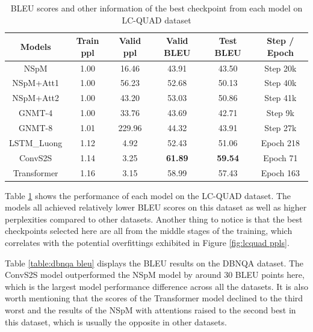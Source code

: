\begin{table}[h]
\centering
\caption{BLEU scores and other information of the best checkpoint from each model on LC-QUAD dataset}
\label{table:lc-quad bleu}
\begin{tabular}{c|c|c|c|c|c}
Models & Train ppl & Valid ppl & \textbf{Valid BLEU} & \textbf{Test BLEU} & Step / Epoch \\
\hline
NSpM & 1.00 & 16.46 & 43.91 & 43.50 & Step 20k \\
NSpM+Att1 & 1.00 & 56.23 & 52.68 & 50.13 & Step 40k \\
NSpM+Att2 & 1.00 & 43.20 & 53.03 & 50.86 & Step 41k \\
GNMT-4 & 1.00 & 33.76 & 43.69 & 42.71 & Step 9k \\
GNMT-8 & 1.01 & 229.96 & 44.32 & 43.91 & Step 27k \\
LSTM\_Luong & 1.12 & 4.92 & 52.43 & 51.06 & Epoch 218 \\
ConvS2S & 1.14 & 3.25 & \textbf{61.89} & \textbf{59.54} & Epoch 71 \\
Transformer & 1.16 & 3.15 & 58.99 & 57.43 & Epoch 163 \\
\end{tabular}
\end{table}

Table \ref{table:lc-quad bleu} shows the performance of each model on the LC-QUAD dataset. The models all achieved relatively lower BLEU scores on this dataset as well as higher perplexities compared to other datasets. Another thing to notice is that the best checkpoints selected here are all from the middle stages of the training, which correlates with the potential overfittings exhibited in Figure \ref{fig:lcquad ppls}.

Table \ref{table:dbnqa bleu} displays the BLEU results on the DBNQA dataset. The ConvS2S model outperformed the NSpM model by around 30 BLEU points here, which is the largest model performance difference across all the datasets. It is also worth mentioning that the scores of the Transformer model declined to the third worst and the results of the NSpM with attentions raised to the second best in this dataset, which is usually the opposite in other datasets.

